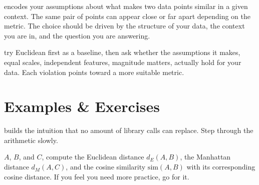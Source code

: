 \vspace{2.5em}
 encodes your assumptions about what 
makes two data points similar in a given context.
The same pair of points can appear close or far apart depending on the metric.
The choice should be driven by the structure of your data, 
the context you are in, and the question you are answering.


 try Euclidean first as a baseline, 
then ask whether the assumptions it makes, equal scales, 
independent features, magnitude matters, actually hold for your data. 
Each violation points toward a more suitable metric. 




\newpage
\section{Examples \& Exercises} 


 builds the intuition that no amount of library calls can replace. Step through the arithmetic slowly.

 $A$, $B$, and $C$, compute the Euclidean distance $d_E(A, B)$,
the Manhattan distance $d_M(A, C)$, and the cosine similarity $\text{sim}(A, B)$ with its corresponding cosine distance. If you feel you need more practice, go for it.

